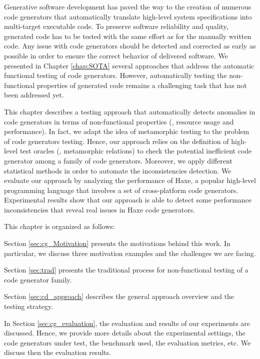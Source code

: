 
Generative software development has paved the way to the creation of numerous code generators that automatically translate high-level system specifications into multi-target executable code.
To preserve software reliability and quality, generated code has to be tested with the same effort as for the manually written code. 
Any issue with code generators should be detected and corrected as early as possible in order to ensure the correct behavior of delivered software.
We presented in Chapter \ref{chap:SOTA} several approaches that address the automatic functional testing of code generators. However, automatically testing the non-functional properties of generated code remains a challenging task that has not been addressed yet.

This chapter describes a testing approach that automatically detects anomalies in code generators in terms of non-functional properties (\ie, resource usage and performance). In fact, we adapt the idea of metamorphic testing to the problem of code generators testing. Hence, our approach relies on the definition of high-level test oracles (\ie, metamorphic relations) to check the potential inefficient code generator among a family of code generators. Moreover, we apply different statistical methods in order to automate the inconsistencies detection.
We evaluate our approach by analyzing the performance of Haxe, a popular high-level programming language that involves a set of cross-platform code generators. 
Experimental results show that our approach is able to detect some performance inconsistencies that reveal real issues in Haxe code generators.

This chapter is organized as follows: 


Section \ref{sec:cg_Motivation} presents the motivations behind this work. In particular, we discuss three motivation examples and the challenges we are facing.

Section \ref{sec:trad} presents the traditional process for non-functional testing of a code generator family.


Section \ref{sec:cd_approach} describes the general approach overview and the testing strategy.

In Section \ref{sec:cg_evaluation}, the evaluation and results of our experiments are discussed. Hence, we provide more details about the experimental settings, the code generators under test, the benchmark used, the evaluation metrics, etc. We discuss then the evaluation results.

